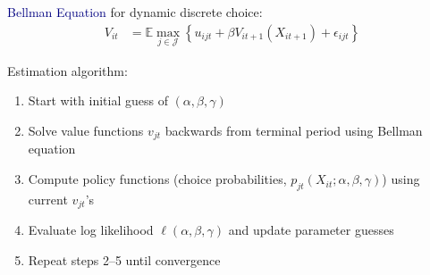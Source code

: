 \documentclass[aspectratio=169]{beamer}
\begin{document}
\begin{frame}
\textcolor{navy}{Bellman Equation} for dynamic discrete choice:
\begin{align*}
V_{it} &= \mathbb{E}\max_{j \in \mathcal{J}}\left\{u_{ijt} + \beta V_{it+1}(X_{it+1}) + \epsilon_{ijt}\right\}
\end{align*}
\end{frame}



\begin{frame}
Estimation algorithm:
\bigskip{}

\begin{enumerate}
\itemsep1.5em
    \item<2-> Start with initial guess of $(\alpha,\beta,\gamma)$
    \item<3-> Solve value functions $v_{jt}$ backwards from terminal period using Bellman equation
    \item<4-> Compute policy functions (choice probabilities, $p_{jt}(X_{it};\alpha,\beta,\gamma)$) using current $v_{jt}$'s
    \item<5-> Evaluate log likelihood $\ell(\alpha,\beta,\gamma)$ and update parameter guesses
    \item<6-> Repeat steps 2--5 until convergence
\end{enumerate}

\end{frame}
\end{document}
